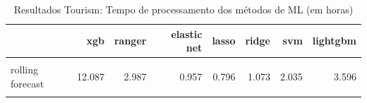 \begin{apendicesenv}
\hypertarget{tbl-tourism-tempo-ml}{}
\begin{table}
\caption{\label{tbl-tourism-tempo-ml}Resultados Tourism: Tempo de processamento dos métodos de ML (em horas) }\tabularnewline

\centering
\begin{tabular}[t]{lrrrrrrr}
\toprule
  & xgb & ranger & elastic net & lasso & ridge & svm & lightgbm\\
\midrule
\cellcolor{gray!10}{fitted base} & \cellcolor{gray!10}{15.767} & \cellcolor{gray!10}{3.687} & \cellcolor{gray!10}{1.540} & \cellcolor{gray!10}{1.282} & \cellcolor{gray!10}{1.371} & \cellcolor{gray!10}{1.977} & \cellcolor{gray!10}{3.535}\\
rolling forecast & 12.087 & 2.987 & 0.957 & 0.796 & 1.073 & 2.035 & 3.596\\
\cellcolor{gray!10}{reduced fitted base} & \cellcolor{gray!10}{24.627} & \cellcolor{gray!10}{15.386} & \cellcolor{gray!10}{6.006} & \cellcolor{gray!10}{4.968} & \cellcolor{gray!10}{5.323} & \cellcolor{gray!10}{10.474} & \cellcolor{gray!10}{19.362}\\
\bottomrule
\end{tabular}
\end{table}

\end{apendicesenv}

%
%
%

